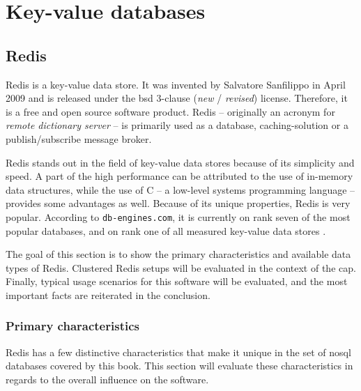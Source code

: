 \chapter{Key-value databases}
\section{Redis}

Redis is a key-value data store. It was invented by Salvatore Sanfilippo in
April 2009 and is released under the \gls{bsd} 3-clause (\textit{new} /
\textit{revised}) license. Therefore, it is a free and open source software
product. Redis -- originally an acronym for \textit{remote dictionary server} --
is primarily used as a database, caching-solution or a publish/subscribe message
broker.

Redis stands out in the field of key-value data stores because of its simplicity
and speed. A part of the high performance can be attributed to the use of
in-memory data structures, while the use of C -- a low-level systems programming
language -- provides some advantages as well. Because of its unique properties,
Redis is very popular. According to \texttt{db-engines.com}, it is currently on
rank seven of the most popular databases, and on rank one of all measured
key-value data stores \parencite{dbenginesRanking}.

The goal of this section is to show the primary characteristics and available
data types of Redis. Clustered Redis setups will be evaluated in the context of
the \gls{cap}. Finally, typical usage scenarios for this software will be
evaluated, and the most important facts are reiterated in the conclusion.

\subsection{Primary characteristics}
Redis has a few distinctive characteristics that make it unique in the set of
\gls{nosql} databases covered by this book. This section will evaluate these
characteristics in regards to the overall influence on the software.

